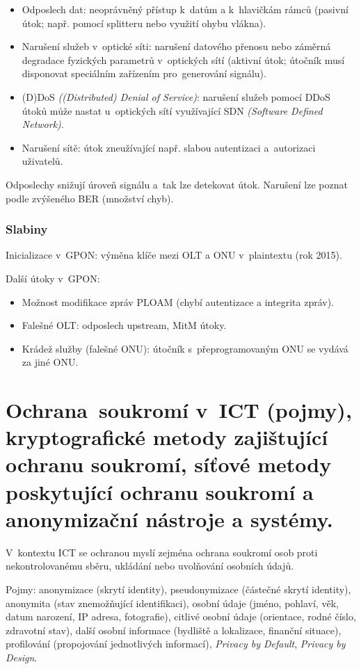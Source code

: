 \begin{itemize}
    \item Odposlech dat: neoprávněný přístup k~datům a k~hlavičkám rámců (pasivní útok; např. pomocí splitteru nebo využití ohybu vlákna).
    \item Narušení služeb v~optické síti: narušení datového přenosu nebo záměrná degradace fyzických parametrů v~optických sítí (aktivní útok; útočník musí disponovat speciálním zařízením pro~generování signálu).
    \item (D)DoS \emph{((Distributed) Denial of Service)}: narušení služeb pomocí DDoS útoků může nastat u~optických sítí využívající SDN \emph{(Software Defined Network)}.
    \item Narušení sítě: útok zneužívající např. slabou autentizaci a~autorizaci uživatelů. 
\end{itemize}

Odposlechy snižují úroveň signálu a~tak lze detekovat útok.
Narušení lze poznat podle zvýšeného BER (množství chyb).

\subsubsection{Slabiny}

Inicializace v~GPON: výměna klíče mezi OLT a ONU v~plaintextu (rok 2015).

Další útoky v~GPON:
\vspace*{-0.5em}\begin{itemize}
    \item Možnost modifikace zpráv PLOAM (chybí autentizace a integrita zpráv).
    \item Falešné OLT: odposlech upstream, MitM útoky.
    \item Krádež služby (falešné ONU): útočník s~přeprogramovaným ONU se vydává za jiné ONU.
\end{itemize}

\clearpage
\section{Ochrana~soukromí v~ICT (pojmy), kryptografické metody zajištující ochranu soukromí, síťové metody poskytující ochranu soukromí a anonymizační nástroje a systémy.}

V~kontextu ICT se ochranou myslí zejména ochrana soukromí osob proti nekontrolovanému sběru, ukládání nebo uvolňování osobních údajů.

Pojmy: anonymizace (skrytí identity), pseudonymizace (částečné skrytí identity), anonymita (stav znemožňující identifikaci), osobní údaje (jméno, pohlaví, věk, datum narození, IP adresa, fotografie), citlivé osobní údaje (orientace, rodné číslo, zdravotní stav), další osobní informace (bydliště a lokalizace, finanční situace), profilování (propojování jednotlivých informací), \emph{Privacy by Default}, \emph{Privacy by Design}.


